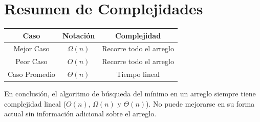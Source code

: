 \documentclass{article}
\begin{document}
	\section{Resumen de Complejidades}
	
	\begin{center}
		\begin{tabular}{ |c|c|c| }
			\hline
			Caso & Notación & Complejidad \\
			\hline
			Mejor Caso & $ \Omega(n) $ & Recorre todo el arreglo \\
			\hline
			Peor Caso & $ O(n) $ & Recorre todo el arreglo \\
			\hline
			Caso Promedio & $ \Theta(n) $ & Tiempo lineal \\
			\hline
		\end{tabular}
	\end{center}
	
	En conclusión, el algoritmo de búsqueda del mínimo en un arreglo siempre tiene complejidad lineal ($ O(n) $, $ \Omega(n) $ y $ \Theta(n) $). No puede mejorarse en su forma actual sin información adicional sobre el arreglo.
	
	
	
\end{document}

